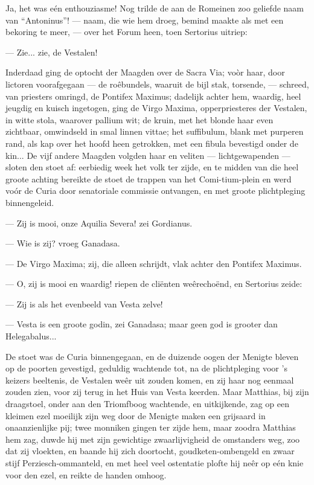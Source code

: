 \documentclass[a4paper, 12pt, oneside, dutch]{article}
\begin{document}
Ja, het was eén enthouziasme! Nog trilde de aan de Romeinen zoo geliefde naam van "`Antoninus"'! --- naam, die wie hem droeg, bemind maakte als met een bekoring te meer, --- over het Forum heen, toen Sertorius uitriep:

--- Zie... zie, de Vestalen!

Inderdaad ging de optocht der Maagden over de Sacra Via; voòr haar, door lictoren voorafgegaan --- de roêbundels, waaruit de bijl stak, torsende, --- schreed, van priesters omringd, de Pontifex Maximus; dadelijk achter hem, waardig, heel jeugdig en kuisch ingetogen, ging de Virgo Maxima, opperpriesteres der Vestalen, in witte stola, waarover pallium wit; de kruin, met het blonde haar even zichtbaar, omwindseld in smal linnen vittae; het suffibulum, blank met purperen rand, als kap over het hoofd heen getrokken, met een fibula bevestigd onder de kin... De vijf andere Maagden volgden haar en veliten --- lichtgewapenden --- sloten den stoet af: eerbiedig week het volk ter zijde, en te midden van die heel groote achting bereikte de stoet de trappen van het Comi-tium-plein en werd voór de Curia door senatoriale commissie ontvangen, en met groote plichtpleging binnengeleid.

--- Zij is mooi, onze Aquilia Severa! zei Gordianus.

--- Wie is zij? vroeg Ganadasa.

--- De Virgo Maxima; zij, die alleen schrijdt, vlak achter den Pontifex Maximus.

--- O, zij is mooi en waardig! riepen de cliënten weêrechoënd, en Sertorius zeide:

--- Zij is als het evenbeeld van Vesta zelve!

--- Vesta is een groote godin, zei Ganadasa; maar geen god is grooter dan Helegabalus...

De stoet was de Curia binnengegaan, en de duizende oogen der Menigte bleven op de poorten gevestigd, geduldig wachtende tot, na de plichtpleging voor 's keizers beeltenis, de Vestalen weêr uit zouden komen, en zij haar nog eenmaal zouden zien, voor zij terug in het Huis van Vesta keerden. Maar Matthias, bij zijn draagstoel, onder aan den Triomfboog wachtende, en uitkijkende, zag op een kleimen ezel moeilijk zijn weg door de Menigte maken een grijsaard in onaanzienlijke pij; twee monniken gingen ter zijde hem, maar zoodra Matthias hem zag, duwde hij met zijn gewichtige zwaarlijvigheid de omstanders weg, zoo dat zij vloekten, en baande hij zich doortocht, goudketen-ombengeld en zwaar stijf Perziesch-ommanteld, en met heel veel ostentatie plofte hij neêr op eén knie voor den ezel, en reikte de handen omhoog.
\end{document}
